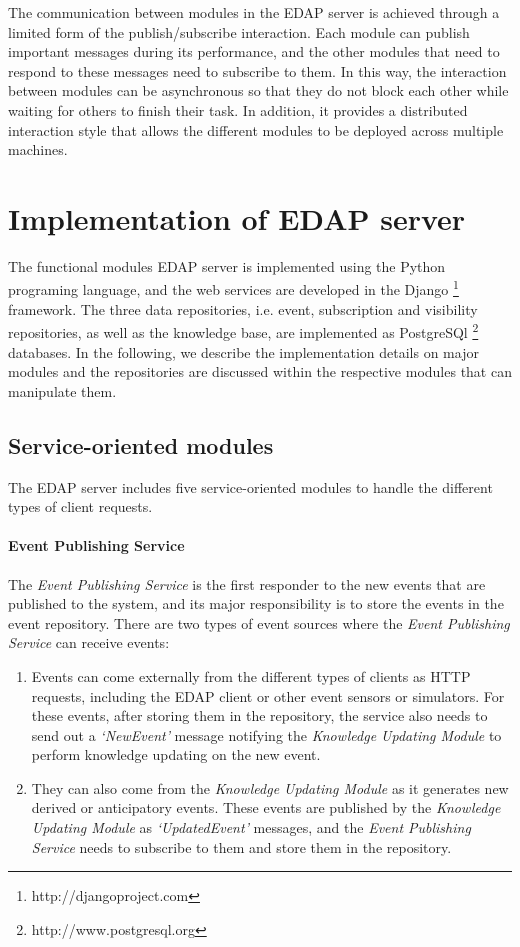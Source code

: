 The communication between modules in the EDAP server is achieved through a limited form of the publish/subscribe interaction. Each module can publish important messages during its performance, and the other modules that need to respond to these messages need to subscribe to them. In this way, the interaction between modules can be asynchronous so that they do not block each other while waiting for others to finish their task. In addition, it provides a distributed interaction style that allows the different modules to be deployed across multiple machines. 

\section{Implementation of EDAP server} %
\label{sec:implementation_of_edap_server}
The functional modules EDAP server is implemented using the Python programing language, and the web services are developed in the Django \footnote{http://djangoproject.com} framework. The three data repositories, i.e. event, subscription and visibility repositories, as well as the knowledge base, are implemented as PostgreSQl \footnote{http://www.postgresql.org} databases. In the following, we describe the implementation details on major modules and the repositories are discussed within the respective modules that can manipulate them. 

\subsection{Service-oriented modules} %
\label{sub:service_oriented_modules}
The EDAP server includes five service-oriented modules to handle the different types of client requests. 

\paragraph*{Event Publishing Service} %
\label{par:event_publishing_service}
The \emph{Event Publishing Service} is the first responder to the new events that are published to the system, and its major responsibility is to store the events in the event repository. There are two types of event sources where the \emph{Event Publishing Service} can receive events:

\begin{enumerate}
	\item Events can come externally from the different types of clients as HTTP requests, including the EDAP client or other event sensors or simulators. For these events, after storing them in the repository, the service also needs to send out a \emph{`NewEvent'} message notifying the \emph{Knowledge Updating Module} to perform knowledge updating on the new event.
	\item They can also come from the \emph{Knowledge Updating Module} as it generates new derived or anticipatory events. These events are published by the \emph{Knowledge Updating Module} as \emph{`UpdatedEvent'} messages, and the \emph{Event Publishing Service} needs to subscribe to them and store them in the repository. 
\end{enumerate}

